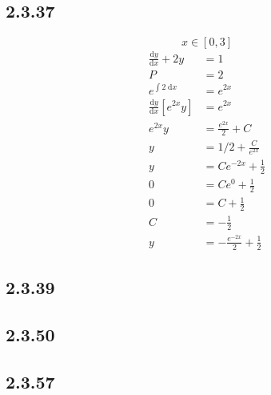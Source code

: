 \documentclass{article}
\begin{document}
\subsection{2.3.37}
\[
    x \in [0,3]
\]
\begin{align*}
    \frac{\mathrm{d}y}{\mathrm{d}x}+2y &= 1\\
    P &= 2\\
    e^{\int 2 \; \mathrm{d}x} &= e^{2x}\\
    \frac{\mathrm{d}y}{\mathrm{d}x}[e^{2x}y] &= e^{2x}\\
    e^{2x}y &= \frac{e^{2x}}{2}+C\\
    y &= 1/2+\frac{C}{e^{2x}}\\
    y &= Ce^{-2x}+\frac{1}{2}\\ 
    0 &= Ce^{0}+\frac{1}{2}\\
    0 &= C+\frac{1}{2}\\
    C &= -\frac{1}{2}\\
    y &= -\frac{e^{-2x}}{2}+\frac{1}{2}
\end{align*}


\subsection{2.3.39}

\subsection{2.3.50}

\subsection{2.3.57}
\end{document}
